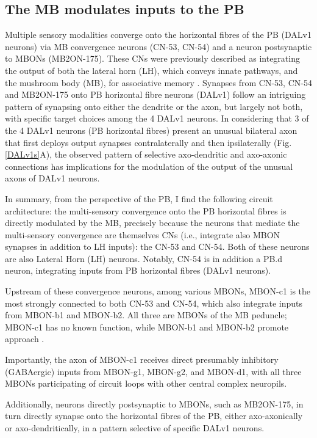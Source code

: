     \subsection{The MB modulates inputs to the PB}
    Multiple sensory modalities converge onto the horizontal fibres of the PB (DALv1 neurons) via MB convergence neurons (CN-53, CN-54) and a neuron postsynaptic to MBONs (MB2ON-175).
    These CNs were previously described as integrating the output of both the lateral horn (LH), which conveys innate pathways, and the mushroom body (MB), for associative memory \citep{eschbach2021circuits}.
    Synapses from CN-53, CN-54 and MB2ON-175 onto PB horizontal fibre neurons (DALv1) follow an intriguing pattern of synapsing onto either the dendrite or the axon, but largely not both, with specific target choices among the 4 DALv1 neurons.
    In considering that 3 of the 4 DALv1 neurons (PB horizontal fibres) present an unusual bilateral axon that first deploys output synapses contralaterally and then ipsilaterally (Fig. \ref{DALv1s}A), the observed pattern of selective axo-dendritic and axo-axonic connections has implications for the modulation of the output of the unusual axons of DALv1 neurons.

    In summary, from the perspective of the PB, I find the following circuit architecture: the multi-sensory convergence onto the PB horizontal fibres is directly modulated by the MB, precisely because the neurons that mediate the multi-sensory convergence are themselves CNs (i.e., integrate also MBON synapses in addition to LH inputs): the CN-53 and CN-54. Both of these neurons are also Lateral Horn (LH) neurons.  Notably, CN-54 is in addition a PB.d neuron, integrating inputs from PB horizontal fibres (DALv1 neurons).

    Upstream of these convergence neurons, among various MBONs, MBON-c1 is the most strongly connected to both CN-53 and CN-54, which also integrate inputs from MBON-b1 and MBON-b2. All three are MBONs of the MB peduncle; MBON-c1 has no known function, while MBON-b1 and MBON-b2 promote approach \citep{eschbach2021circuits}.

   Importantly, the axon of MBON-c1 receives direct presumably inhibitory (GABAergic) inputs from MBON-g1, MBON-g2, and MBON-d1, with all three MBONs participating of circuit loops with other central complex neuropils.

    Additionally, neurons directly postsynaptic to MBONs, such as MB2ON-175, in turn directly synapse onto the horizontal fibres of the PB, either axo-axonically or axo-dendritically, in a pattern selective of specific DALv1 neurons.

